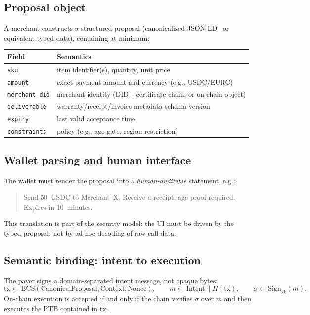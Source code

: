\documentclass[11pt]{article}
\begin{document}
\subsection{Proposal object}
A merchant constructs a structured proposal (canonicalized JSON-LD~\cite{jsonld} or equivalent typed data), containing at minimum:
\begin{center}
\begin{tabular}{@{}ll@{}}
\toprule
Field & Semantics \\
\midrule
\texttt{sku} & item identifier(s), quantity, unit price \\
\texttt{amount} & exact payment amount and currency (e.g., USDC/EURC) \\
\texttt{merchant\_did} & merchant identity (DID~\cite{did-core}, certificate chain, or on-chain object) \\
\texttt{deliverable} & warranty/receipt/invoice metadata schema version \\
\texttt{expiry} & last valid acceptance time \\
\texttt{constraints} & policy (e.g., age-gate, region restriction) \\
\bottomrule
\end{tabular}
\end{center}

\subsection{Wallet parsing and human interface}
The wallet must render the proposal into a \emph{human-auditable} statement, e.g.:
\begin{quote}
Send 50~USDC to Merchant~X. Receive a receipt; age proof required. Expires in 10~minutes.
\end{quote}
This translation is part of the security model: the UI must be driven by the typed proposal, not by ad hoc decoding of raw call data.

\subsection{Semantic binding: intent to execution}
The payer signs a domain-separated intent message, not opaque bytes:
$$
\mathrm{tx} \leftarrow \mathrm{BCS}(\mathrm{CanonicalProposal}, \mathrm{Context}, \mathrm{Nonce}),
\qquad m \leftarrow \mathrm{Intent} \parallel H(\mathrm{tx}),
\qquad \sigma \leftarrow \mathrm{Sign}_{sk}(m).
$$
On-chain execution is accepted if and only if the chain verifies $\sigma$ over $m$ and then executes the PTB contained in $\mathrm{tx}$.
\end{document}
